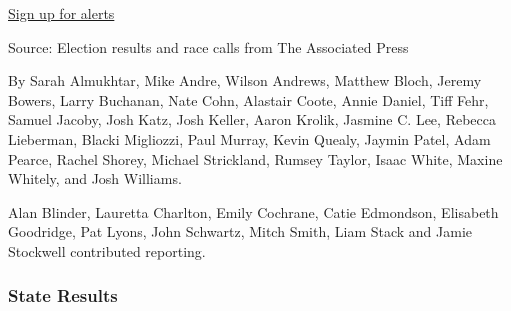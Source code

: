 \protect\hyperlink{}{Sign up for alerts}

Source: Election results and race calls from The Associated Press

By Sarah Almukhtar, Mike Andre, Wilson Andrews, Matthew Bloch, Jeremy
Bowers, Larry Buchanan, Nate Cohn, Alastair Coote, Annie Daniel, Tiff
Fehr, Samuel Jacoby, Josh Katz, Josh Keller, Aaron Krolik, Jasmine C.
Lee, Rebecca Lieberman, Blacki Migliozzi, Paul Murray, Kevin Quealy,
Jaymin Patel, Adam Pearce, Rachel Shorey, Michael Strickland, Rumsey
Taylor, Isaac White, Maxine Whitely, and Josh Williams.

Alan Blinder, Lauretta Charlton, Emily Cochrane, Catie Edmondson,
Elisabeth Goodridge, Pat Lyons, John Schwartz, Mitch Smith, Liam Stack
and Jamie Stockwell contributed reporting.

\hypertarget{state-results}{%
\subsubsection{State Results}\label{state-results}}

